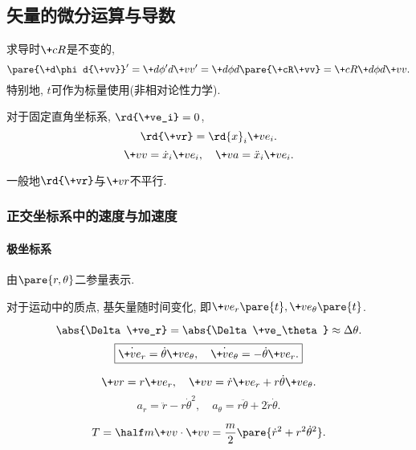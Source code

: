 \documentclass{ctexart}
\begin{document}
\subsection{矢量的微分运算与导数} %
\label{sub:矢量的微分运算与导数}

\begin{lemma}[坐标变换下的导数]
    求导时$\+cR$是不变的,
    \[ \pare{\+d\phi d{\+vv}}' = \+d{\phi'}d{\+vv'} = \+d{\phi}d{\pare{\+cR\+vv}} = \+cR\+d\phi d{\+vv}. \]
    特别地, $t$可作为标量使用(非相对论性力学).
\end{lemma}
\begin{lemma}
    对于固定直角坐标系, $\rd{\+ve_i} = 0$,
    \[ \rd{\+vr} = \rd{x}_i \+ve_i. \]
    \[ \+vv = \dot{x}_i \+ve_i,\quad \+va = \ddot{x}_i \+ve_i. \]
\end{lemma}
\begin{pitfall}
    一般地$\rd{\+vr}$与$\+vr$不平行.
\end{pitfall}

\subsubsection{正交坐标系中的速度与加速度} %
\label{ssub:正交坐标系中的速度与加速度}

\paragraph{极坐标系} %
\label{par:极坐标系}

由$\pare{r,\theta}$二参量表示.

\begin{figure}[ht]
    \centering
\end{figure}
\begin{pitfall}
    对于运动中的质点, 基矢量随时间变化, 即$\+ve_r\pare{t},\+ve_\theta\pare{t}$.
\end{pitfall}

\begin{figure}[ht]
    \centering
\end{figure}
\[ \abs{\Delta\+ve_r} = \abs{\Delta\+ve_\theta} \approx \Delta\theta. \]
\[ \boxed{\dot{\+ve_r} = \dot{\theta}\+ve_\theta,\quad \dot{\+ve_\theta} = -\dot{\theta}\+ve_r.} \]
\begin{finale}
    \begin{theorem}
        \[ \+vr = r\+ve_r,\quad \+vv = \dot{r}\+ve_r + r\dot{\theta}\+ve_\theta. \]
        \[ a_r = \ddot{r} - r\dot{\theta}^2,\quad a_\theta = r\ddot{\theta} + 2\dot{r}\dot{\theta}. \]
    \end{theorem}
\end{finale}
\begin{finale}
    \begin{theorem}[极坐标系下的动能]
        \[ T = \half m\+vv\cdot\+vv = \frac{m}{2}\pare{\dot{r}^2 + r^2\dot{\theta}^2}. \]
    \end{theorem}
\end{finale}
\end{document}
